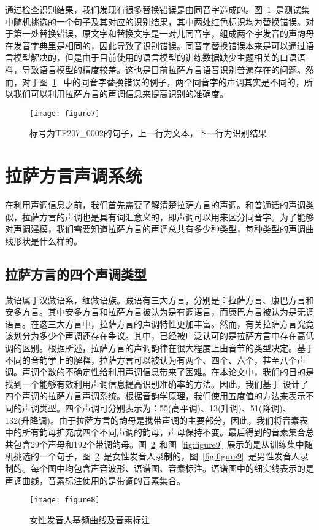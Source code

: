 通过检查识别结果，我们发现有很多替换错误是由同音字造成的。图~\ref{fig:figure7}~是测试集中随机挑选的一个句子及其对应的识别结果，其中两处红色标识均为替换错误。对于第一处替换错误，原文字和替换文字是一对儿同音字，组成两个字发音的声韵母在发音字典里是相同的，因此导致了识别错误。同音字替换错误本来是可以通过语言模型解决的，但是由于目前使用的语言模型的训练数据缺少主题相关的口语语料，导致语言模型的精度较差。这也是目前拉萨方言语音识别普遍存在的问题。然而，对于图~\ref{fig:figure7}~ 中的同音字替换错误的例子，两个同音字的声调其实是不同的，所以我们可以利用拉萨方言的声调信息来提高识别的准确度。
\begin{figure}[htbp]
\centering
\texttt{[image: figure7]}
\caption{标号为TF207\_0002的句子，上一行为文本，下一行为识别结果}\label{fig:figure7}
\vspace{\baselineskip}
\end{figure}

\section{拉萨方言声调系统}
在利用声调信息之前，我们首先需要了解清楚拉萨方言的声调。和普通话的声调类似，拉萨方言的声调也是具有词汇意义的，即声调可以用来区分同音字。为了能够对声调建模，我们需要知道拉萨方言的声调总共有多少种类型，每种类型的声调曲线形状是什么样的。
\subsection{拉萨方言的四个声调类型}
藏语属于汉藏语系，缅藏语族。藏语有三大方言，分别是：拉萨方言、康巴方言和安多方言。其中安多方言和拉萨方言被认为是有调语言，而康巴方言被认为是无调语言。在这三大方言中，拉萨方言的声调特性更加丰富。然而，有关拉萨方言究竟该划分为多少个声调还存在争议。其中，已经被广泛认可的是拉萨方言中存在高低调的区别。根据\cite{hu2010lhasa}所述，拉萨方言的声调韵律在很大程度上由音节的类型决定。基于不同的音韵学上的解释，拉萨方言可以被认为有两个、四个、六个，甚至八个声调。声调个数的不确定性给利用声调信息带来了困难。在本论文中，我们的目的是找到一个能够有效利用声调信息提高识别准确率的方法。因此，我们基于\cite{Yudaoquan} 设计了四个声调的拉萨方言声调系统。根据音韵学原理，我们使用五度值的方法\cite{chao1980system}来表示不同的声调类型。四个声调可分别表示为：55(高平调)、13(升调)、51(降调)、132(升降调)。由于拉萨方言的韵母是携带声调的主要部分，因此，我们将音素表中的所有韵母扩充成四个不同声调的韵母，声母保持不变。最后得到的音素集合总共包含29个声母和192个带调韵母。图~\ref{fig:figure8}~和图~\ref{fig:figure9}~展示的是从训练集中随机挑选的一个句子，图~\ref{fig:figure8}~是女性发音人录制的，图~\ref{fig:figure9}~是男性发音人录制的。每个图中均包含声音波形、语谱图、音素标注。语谱图中的细实线表示的是声调曲线，音素标注使用的是带调的音素集合。
\begin{figure}[htbp]
\centering
\texttt{[image: figure8]}
\caption{女性发音人基频曲线及音素标注}\label{fig:figure8}
\vspace{\baselineskip}
\end{figure}

